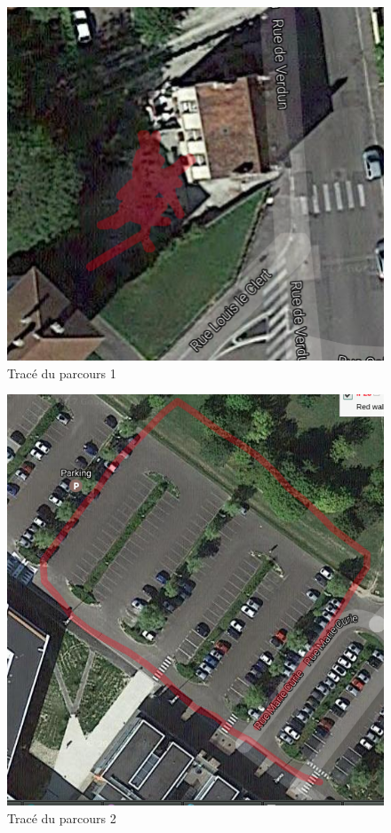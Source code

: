 \documentclass{report}
\begin{document}
\begin{figure}[H]
	\begin{center}
		\includegraphics[scale=0.5]{Enregistrements/parcoursEnrUno1206.png}
	\end{center}
	\caption{Tracé du parcours 1}
\end{figure}

\begin{figure}[H]
	\begin{center}
		\includegraphics[scale=0.5]{Enregistrements/parcoursEnrDos1206.png}
	\end{center}
	\caption{Tracé du parcours 2}
\end{figure}
\end{document}

